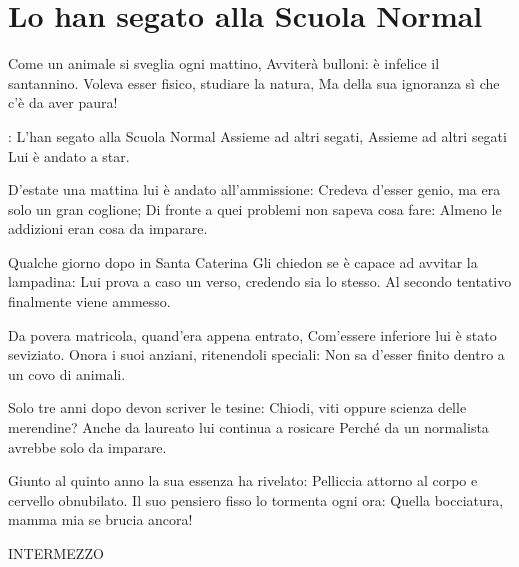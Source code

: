 \section{Lo han segato alla Scuola Normal}
\subtitle{Sulla melodia di “Whiskey in the Jar”, versione dei Dubliners}
\begin{canzone}
Come un animale si sveglia ogni mattino,
Avviterà bulloni: è infelice il santannino.
Voleva esser fisico, studiare la natura,
Ma della sua ignoranza sì che c’è da aver paura!

\ARIT: L’han segato alla Scuola Normal
\aritskip Assieme ad altri segati,
\aritskip Assieme ad altri segati
\aritskip Lui è andato a star.

D’estate una mattina lui è andato all’ammissione:
Credeva d’esser genio, ma era solo un gran coglione;
Di fronte a quei problemi non sapeva cosa fare:
Almeno le addizioni eran cosa da imparare.

\RIT

Qualche giorno dopo in Santa Caterina
Gli chiedon se è capace ad avvitar la lampadina:
Lui prova a caso un verso, credendo sia lo stesso.
Al secondo tentativo finalmente viene ammesso.

\RIT

Da povera matricola, quand’era appena entrato,
Com’essere inferiore lui è stato seviziato.
Onora i suoi anziani, ritenendoli speciali:
Non sa d’esser finito dentro a un covo di animali.

\RIT

Solo tre anni dopo devon scriver le tesine:
Chiodi, viti oppure scienza delle merendine?
Anche da laureato lui continua a rosicare
Perché da un normalista avrebbe solo da imparare.

\RIT

Giunto al quinto anno la sua essenza ha rivelato:
Pelliccia attorno al corpo e cervello obnubilato.
Il suo pensiero fisso lo tormenta ogni ora:
Quella bocciatura, mamma mia se brucia ancora!

\RITB
\end{canzone}
\clearpage
\logofalse

INTERMEZZO
\clearpage
\logotrue
